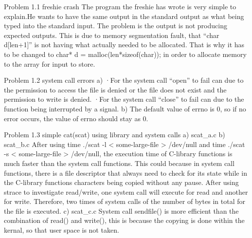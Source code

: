 Problem 1.1 freshie crash
		The program the freshie has wrote is very simple to explain.He wants to have the same output in the standard output as what being typed into the standard input. The problem is the output is not producing expected outputs.
		This is due to memory segmentation fault, that “char d[len+1]” is not having what actually needed to be allocated. That is why it has to be changed to
																		char* d = malloc(len*sizeof(char));
		in order to allocate memory to the array for input to store.

Problem 1.2 system call errors
		a) 
				·For the system call “open” to fail can due to the permission to access the file is denied or the file does not 
				 exist and the permission to write is denied.
				·For the system call “close” to fail can due to the function being interrupted by a signal.
		b)
				The default value of errno is 0, so if no error occurs, the value of errno should stay as 0.

Problem 1.3 simple cat(scat) using library and system calls
		a)	scat_a.c
		b)	scat_b.c
				After using 	time ./scat -l < some-large-file > /dev/null  and 
										time ./scat -s < some-large-file > /dev/null, 
				the execution time of C-library functions is much faster than the system call functions.
		This could because in system call functions, there is a file descriptor that always need to check for its state while in the C-library functions characters being copied without any pause. 
		After using strace to investigate read/write, one system call will execute for read and another for write. Therefore, two times of system calls of the number of bytes in total for the file is executed.
		c)		scat_c.c
				System call sendfile() is more efficient than the combination of read() and write(), this is because the copying is done within the kernal, so that user space is not taken.
